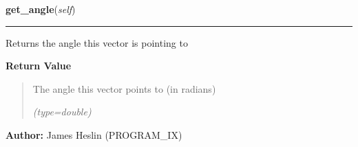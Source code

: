 \hspace{.8\funcindent}\begin{boxedminipage}{\funcwidth}

    \raggedright \textbf{get\_angle}(\textit{self})

    \vspace{-1.5ex}

    \rule{\textwidth}{0.5\fboxrule}
\setlength{\parskip}{2ex}
    Returns the angle this vector is pointing to

\setlength{\parskip}{1ex}
      \textbf{Return Value}
    \vspace{-1ex}

      \begin{quote}
      The angle this vector points to (in radians)

      {\it (type=double)}

      \end{quote}

\textbf{Author:} James Heslin (PROGRAM\_IX)



    \end{boxedminipage}

    \label{pystroke:vector2:Vector2:__add__}

    \vspace{0.5ex}

